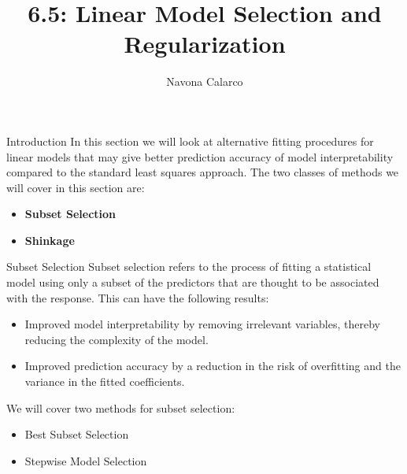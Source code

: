 \documentclass[
  ignorenonframetext,
  aspectratio=169,
]{beamer}
\title{6.5: Linear Model Selection and Regularization}
\author{Navona Calarco}
\date{}
\institute{The University of Toronto}
\begin{document}
\frame{\titlepage}
\ifdefined\Shaded\renewenvironment{Shaded}{\begin{tcolorbox}[frame hidden, sharp corners, borderline west={3pt}{0pt}{shadecolor}, boxrule=0pt, breakable, interior hidden, enhanced]}{\end{tcolorbox}}\fi

\begin{frame}{Introduction}
\protect\hypertarget{introduction}{}
In this section we will look at alternative fitting procedures for
linear models that may give better prediction accuracy of model
interpretability compared to the standard least squares approach. The
two classes of methods we will cover in this section are:

\begin{itemize}
\item
  \textbf{Subset Selection}
\item
  \textbf{Shinkage}
\end{itemize}
\end{frame}

\begin{frame}{Subset Selection}
\protect\hypertarget{subset-selection}{}
Subset selection refers to the process of fitting a statistical model
using only a subset of the predictors that are thought to be associated
with the response. This can have the following results:

\begin{itemize}
\item
  Improved \alert{model interpretability} by removing irrelevant
  variables, thereby reducing the complexity of the model.
\item
  Improved \alert{prediction accuracy} by a reduction in the risk of
  overfitting and the variance in the fitted coefficients.
\end{itemize}

We will cover two methods for subset selection:

\begin{itemize}
\item
  Best Subset Selection
\item
  Stepwise Model Selection
\end{itemize}
\end{frame}
\end{document}
